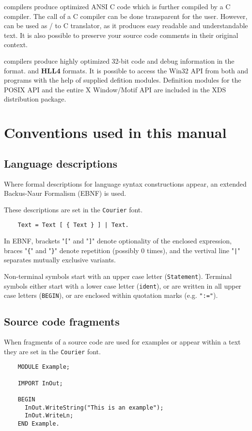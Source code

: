 \ifgenc

 \xds{} compilers produce optimized ANSI C code which is further
 compiled by a C compiler. The call of a C compiler can be done
 transparent for the user. However, \xds{} can be used as
 \mt/\ot{} to C translator, as it produces easy readable and
 understandable text. It is also possible to preserve your source
 code comments in their original context.

\fi
\ifgencode
   \xds{} compilers produce highly optimized 32-bit code and debug
   information in the
    format. and {\bf HLL4} formats.\fi{}
 \ifwinnt
   It is possible to access the Win32 API from both \mt{} and \ot{}
   programs with the help of supplied defition modules.
 \fi
 \iflinux %
   Definition modules for the POSIX API and the entire X Window/Motif API
   are included in the XDS distribution package.
 \fi

\fi %

\section{Conventions used in this manual}

\subsection{Language descriptions}

Where formal descriptions for language syntax constructions appear, an
extended Backus-Naur Formalism (EBNF) is used.

These descriptions are set in the {\tt Courier} font.

\verb'    Text = Text [ { Text } ] | Text.'

In EBNF, brackets "\verb'['" and "\verb']'" denote optionality of the
enclosed expression, braces "\verb'{'" and "\verb'}'" denote repetition
(possibly 0 times), and the vertival line "\verb'|'" separates
mutually exclusive variants. %

Non-terminal symbols start with an upper case letter (\verb'Statement').
Terminal symbols either start with a lower case letter (\verb'ident'), or are
written in all upper case letters (\verb'BEGIN'), or are enclosed within
quotation marks (e.g. \verb'":="').

\subsection{Source code fragments}

When fragments of a source code are used for examples or appear within
a text they are set in the {\tt Courier} font.

\begin{verbatim}
    MODULE Example;

    IMPORT InOut;

    BEGIN
      InOut.WriteString("This is an example");
      InOut.WriteLn;
    END Example.
\end{verbatim}

